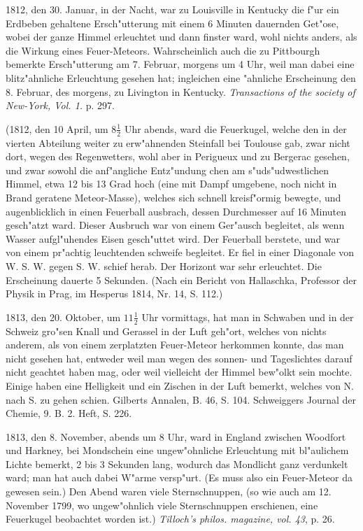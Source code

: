 \documentclass[a4paper, 11pt, oneside, polutonikogreek, german]{article}
\begin{document}
1812, den 30. Januar, in der Nacht, war zu Louisville in Kentucky die f"ur ein Erdbeben gehaltene Ersch"utterung mit einem 6 Minuten dauernden Get"ose, wobei der ganze Himmel erleuchtet und dann finster ward, wohl nichts anders, als die Wirkung eines Feuer-Meteors. Wahrscheinlich auch die zu Pittbourgh bemerkte Ersch"utterung am 7. Februar, morgens um 4 Uhr, weil man dabei eine blitz"ahnliche Erleuchtung gesehen hat; ingleichen eine "ahnliche Erscheinung den 8. Februar, des morgens, zu Livington in Kentucky. \emph{Transactions of the society of New-York, Vol. 1.} p. 297.

(1812, den 10 April, um $\mathfrak{8\frac{1}{2}}$ Uhr abends, ward die Feuerkugel, welche den in der vierten Abteilung weiter zu erw"ahnenden Steinfall bei Toulouse gab, zwar nicht dort, wegen des Regenwetters, wohl aber in Perigueux und zu Bergerac gesehen, und zwar sowohl die anf"angliche Entz"undung chen am s"uds"udwestlichen Himmel, etwa 12 bis 13 Grad hoch (eine mit Dampf umgebene, noch nicht in Brand geratene Meteor-Masse), welches sich schnell kreisf"ormig bewegte, und augenblicklich in einen Feuerball ausbrach, dessen Durchmesser auf 16 Minuten gesch"atzt ward. Dieser Ausbruch war von einem Ger"ausch begleitet, als wenn Wasser aufgl"uhendes Eisen gesch"uttet wird. Der Feuerball berstete, und war von einem pr"achtig leuchtenden schweife begleitet. Er fiel in einer Diagonale von W. S. W. gegen S. W. schief herab. Der Horizont war sehr erleuchtet. Die Erscheinung dauerte 5 Sekunden. (Nach ein Bericht von Hallaschka, Professor der Physik in Prag, im Hesperus 1814, Nr. 14, S. 112.)

1813, den 20. Oktober, um $\mathfrak{11\frac{1}{2}}$ Uhr vormittags, hat man in Schwaben und in der Schweiz gro"sen Knall und Gerassel in der Luft geh"ort, welches von nichts anderem, als von einem zerplatzten Feuer-Meteor herkommen konnte, das man nicht gesehen hat, entweder weil man wegen des sonnen- und Tageslichtes darauf nicht geachtet haben mag, oder weil vielleicht der Himmel bew"olkt sein mochte. Einige haben eine Helligkeit und ein Zischen in der Luft bemerkt, welches von N. nach S. zu gehen schien. Gilberts Annalen, B. 46, S. 104. Schweiggers Journal der Chemie, 9. B. 2. Heft, S. 226.

1813, den 8. November, abends um 8 Uhr, ward in England zwischen Woodfort und Harkney, bei Mondschein eine ungew"ohnliche Erleuchtung mit bl"aulichem Lichte bemerkt, 2 bis 3 Sekunden lang, wodurch das Mondlicht ganz verdunkelt ward; man hat auch dabei W"arme versp"urt. (Es muss also ein Feuer-Meteor da gewesen sein.) Den Abend waren viele Sternschnuppen, (so wie auch am 12. November 1799, wo ungew"ohnlich viele Sternschnuppen erschienen, eine Feuerkugel beobachtet worden ist.) \emph{Tilloch's philos. magazine, vol. 43}, p. 26.
\end{document}
